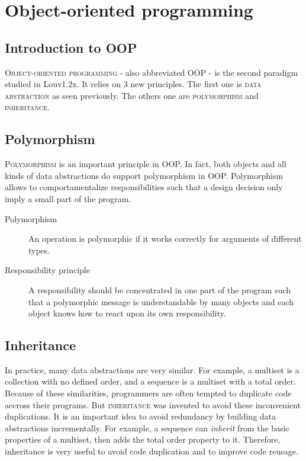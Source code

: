 \documentclass[11pt,a4paper,twoside,openright]{report}
\begin{document}
\section{Object-oriented programming}

\subsection{Introduction to OOP}
\textsc{Object-oriented programming} - also abbreviated \textsc{OOP} - is the 
second paradigm studied in Louv1.2x. It relies on 3 new principles. The first 
one is \textsc{data abstraction} as seen previously. The others one are 
\textsc{polymorphism} and \textsc{inheritance}.

\subsection{Polymorphism}

\textsc{Polymorphism} is an important principle in OOP. In fact, both objects 
and all kinds of data abstractions do support polymorphism in OOP. Polymorphism 
allows to comportamentalize responsibilities such that a design decision only 
imply a small part of the program.

\begin{description}
 \item[Polymorphism] An operation is polymorphic if it works correctly for 
arguments of different types.
 \item[Responsibility principle] A responsibility should be concentrated in one 
part of the program such that a polymorphic message is understandable by many 
objects and each object knows how to react upon its own responsibility.
\end{description}

\subsection{Inheritance}

In practice, many data abstractions are very similar. For example, a multiset 
is a collection with no defined order, and a sequence is a multiset with a 
total 
order. Because of these similarities, programmers are often tempted to 
duplicate 
code accross their programs.
But \textsc{inheritance} was invented to avoid these inconvenient duplications. 
It is an important idea to avoid redundancy by building data abstractions 
incrementally. For example, a sequence can \textit{inherit} from the basic 
properties of a multiset, then adds the total order property to it. Therefore, 
inheritance is very useful to avoid code duplication and to improve code 
reusage.\\
\end{document}
